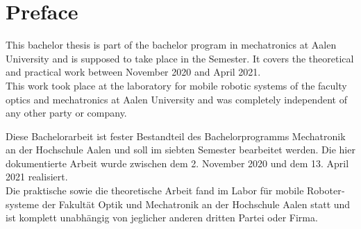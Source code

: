 \chapter*{Preface}
\label{preface}

This bachelor thesis is part of the bachelor program in mechatronics at Aalen University and is supposed to take place in the  Semester. It covers the theoretical and practical work between November  2020 and April  2021.\\

This work took place at the laboratory for mobile robotic systems of the faculty optics and mechatronics at Aalen University and was completely independent of any other party or company.

\vspace*{25mm}

\begin{otherlanguage}{ngerman}
Diese Bachelorarbeit ist fester Bestandteil des Bachelorprogramms Mechatronik an der Hochschule Aalen und soll im siebten Semester bearbeitet werden. Die hier dokumentierte Arbeit wurde zwischen dem 2. November 2020 und dem 13. April 2021 realisiert.\\

Die praktische sowie die theoretische Arbeit fand im Labor für mobile Robotersysteme der Fakultät Optik und Mechatronik an der Hochschule Aalen statt und ist komplett unabhängig von jeglicher anderen dritten Partei oder Firma.
\end{otherlanguage}